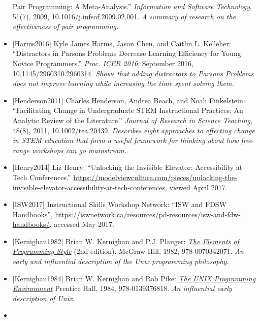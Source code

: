 \documentclass[10pt,statementpaper]{memoir}
\begin{document}
\begin{itemize}
  Pair Programming: A Meta-Analysis.'' \emph{Information and Software
  Technology}, 51(7), 2009, 10.1016/j.infsof.2009.02.001. \emph{A
  summary of research on the effectiveness of pair programming.}
\item
  \protect\hypertarget{harms-parsons}{}{{[}Harms2016{]}} {Kyle James
  Harms, Jason Chen, and Caitlin L. Kelleher: ``Distractors in Parsons
  Problems Decrease Learning Efficiency for Young Novice Programmers.''
  \emph{Proc. ICER 2016}, September 2016, 10.1145/2960310.2960314.
  \emph{Shows that adding distractors to Parsons Problems does not
  improve learning while increasing the time spent solving them.}}
\item
  \protect\hypertarget{henderson-facilitating}{}{{[}Henderson2011{]}}
  Charles Henderson, Andrea Beach, and Noah Finkelstein: ``Facilitating
  Change in Undergraduate STEM Instructional Practices: An Analytic
  Review of the Literature.'' \emph{Journal of Research in Science
  Teaching}, 48(8), 2011, 10.1002/tea.20439. \emph{Describes eight
  approaches to effecting change in STEM education that form a useful
  framework for thinking about how free-range workshops can go
  mainstream.}
\item
  \protect\hypertarget{henry-accessibility}{}{{[}Henry2014{]}} Liz
  Henry: ``Unlocking the Invisible Elevator: Accessibility at Tech
  Conferences.''
  \url{https://modelviewculture.com/pieces/unlocking-the-invisible-elevator-accessibility-at-tech-conferences},
  viewed April 2017.
\item
  \protect\hypertarget{isw-resources}{}{{[}ISW2017{]}} Instructional
  Skills Workshop Network: ``ISW and FDSW Handbooks'',
  \url{https://iswnetwork.ca/resources/pd-resources/isw-and-fdw-handbooks/},
  accessed May 2017.
\item
  \protect\hypertarget{kernighan-plauger-elements}{}{{[}Kernighan1982{]}}
  Brian W. Kernighan and P.J. Plauger:
  \emph{\href{https://www.amazon.com/Elements-Programming-Style-2nd/dp/0070342075/}{The
  Elements of Programming Style}} (2nd edition). McGraw-Hill, 1982,
  978-0070342071. \emph{An early and influential description of the Unix
  programming philosophy.}
\item
  \protect\hypertarget{kernighan-pike-upe}{}{{[}Kernighan1984{]}} Brian
  W. Kernighan and Rob Pike:
  \emph{\href{https://www.amazon.com/Unix-Programming-Environment-Prentice-Hall-Software/dp/013937681X/}{The
  UNIX Programming Environment}} Prentice Hall, 1984, 978-0139376818.
  \emph{An influential early description of Unix.}
\item

\end{itemize}
\end{document}
